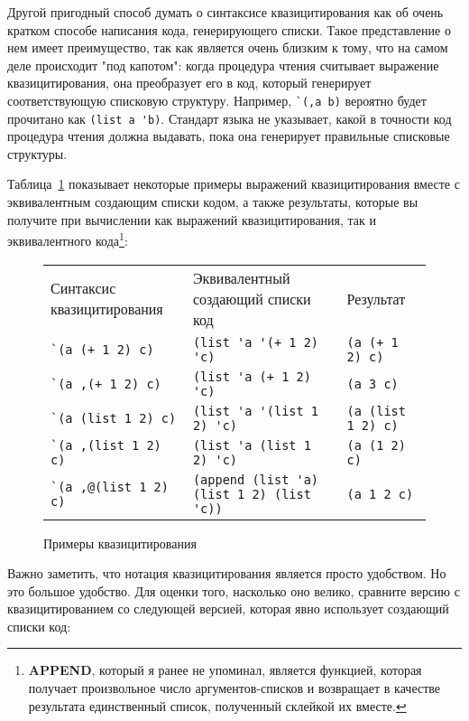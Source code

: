 Другой пригодный способ думать о синтаксисе квазицитирования как об очень кратком способе
написания кода, генерирующего списки. Такое представление о нем имеет преимущество, так
как является очень близким к тому, что на самом деле происходит "под капотом": когда
процедура чтения считывает выражение квазицитирования, она преобразует его в код, который
генерирует соответствующую списковую структуру. Например, \lstinline!`(,a b)! вероятно
будет прочитано как \lstinline!(list a 'b)!. Стандарт языка не указывает, какой в точности
код процедура чтения должна выдавать, пока она генерирует правильные списковые структуры.

Таблица~\ref{table:08-1} показывает некоторые примеры выражений квазицитирования вместе с
эквивалентным создающим списки кодом, а также результаты, которые вы получите при
вычислении как выражений квазицитирования, так и эквивалентного
кода\footnote{\textbf{APPEND}, который я ранее не упоминал, является функцией, которая
  получает произвольное число аргументов-списков и возвращает в качестве результата
  единственный список, полученный склейкой их вместе.}:

\begin{figure}[tb]
\begin{tabular}{|>{\centering}m{25mm}|>{\centering}m{25mm}|>{\centering}m{25mm}|}
Синтаксис квазицитирования & Эквивалентный создающий списки код & Результат \\
\lstinline!`(a (+ 1 2) c)! & \lstinline!(list 'a '(+ 1 2) 'c)! & \lstinline!(a (+ 1 2) c)! \\
\lstinline!`(a ,(+ 1 2) c)! & \lstinline!(list 'a (+ 1 2) 'c)! & \lstinline!(a 3 c)! \\
\lstinline!`(a (list 1 2) c)! & \lstinline!(list 'a '(list 1 2) 'c)! & \lstinline!(a (list 1 2) c)! \\
\lstinline!`(a ,(list 1 2) c)! & \lstinline!(list 'a (list 1 2) 'c)! & \lstinline!(a (1 2) c)! \\
\lstinline!`(a ,@(list 1 2) c)! & \lstinline!(append (list 'a) (list 1 2) (list 'c))! & \lstinline!(a 1 2 c)! 
\end{tabular}
  \caption{Примеры квазицитирования} 
  \label{table:08-1}
\end{figure}

Важно заметить, что нотация квазицитирования является просто удобством. Но это большое
удобство. Для оценки того, насколько оно велико, сравните версию  с
квазицитированием со следующей версией, которая явно использует создающий списки код:


